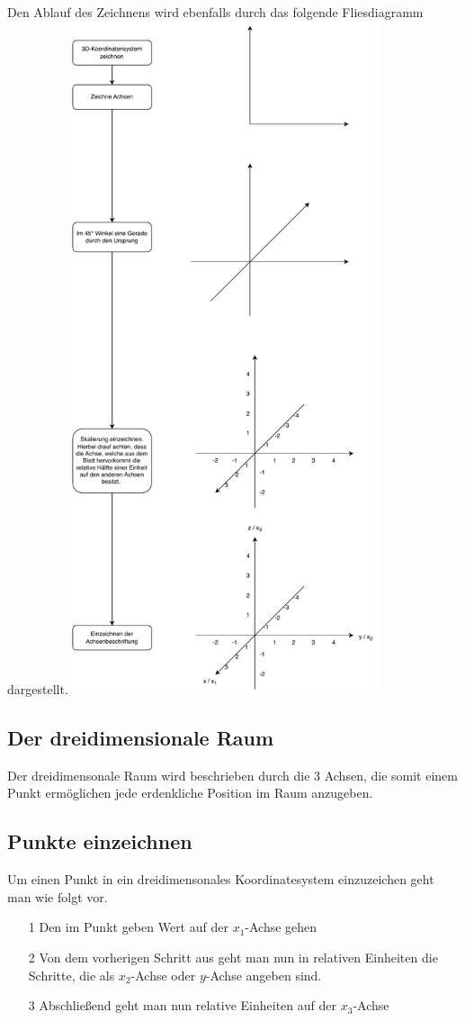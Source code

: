 Den Ablauf des Zeichnens wird ebenfalls durch das folgende Fliesdiagramm dargestellt. 
\includegraphics[width=9cm]{Algorithmen/karthesisches-Koordinatensystem-zeichen/karthesisches-Koordinatensystem-zeichen.drawio.pdf}
\subsection{Der dreidimensionale Raum}
Der dreidimensonale Raum wird beschrieben durch die 3 Achsen, die somit einem Punkt ermöglichen jede erdenkliche Position im Raum anzugeben. 


\subsection{Punkte einzeichnen}
Um einen Punkt in ein dreidimensonales Koordinatesystem einzuzeichen geht man wie folgt vor.
\begin{itemize}
	\item[1] Den im Punkt geben Wert auf der $x_1$-Achse gehen
	\item[2] Von dem vorherigen Schritt aus geht man nun in relativen Einheiten die Schritte, die als $x_2$-Achse oder $y$-Achse angeben sind. 
	\item[3] Abschließend geht man nun relative Einheiten auf der $x_3$-Achse  
\end{itemize} 

